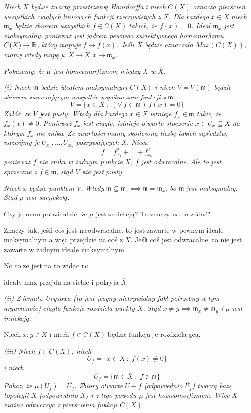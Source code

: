 \documentclass{article}
\begin{document}
\emph{\color{pink}Niech $X$ będzie zwartą przestrzenią Hausdorffa i niech $C(X)$ oznacza pierścień wszystkich ciągłych liniowych funkcji rzeczywistych z $X$. Dla każdego $x\in X$ niech $\mathfrak{m}_x$ będzie zbiorem wszystkich $f\in C(X)$ takich, że $f(x)=0$. Ideał $\mathfrak{m}_x$ jest maksymalny, ponieważ jest jądrem pewnego suriektywnego homomorfizmu $C(X)\to\mathbb{R}$, który mapuje $f\to f(x)$. Jeśli $\overline X$ będzie oznaczało $Max(C(X))$, mamy wtedy mapę $\mu :X\to\overline X$ $x\mapsto \mathfrak{m}_x$.}

\emph{\color{pink}Pokażemy, że $\mu$ jest homeomorfizmem między $X$ w $\overline X$.}

{\color{yellow}\emph{(i) Niech $\mathfrak{m}$ będzie ideałem maksymalnym $C(X)$ i niech $V =V(\mathfrak{m})$ będzie zbiorem zawierającym wszystkie wspólne zera funkcji z $\mathfrak{m}$}
$$V=\{x\in X\;:\;(\forall\;f\in\mathfrak{m})\;f(x)=0\}$$
\emph{Załóż, że $V$ jest pusty. Wtedy dla każdego $x\in X$ istnieje $f_x\in\mathfrak{m}$ takie, że $f_x(x)\neq 0$. Ponieważ $f_x$ jest ciągłe, istnieje otwarte otoczenie $x\in U_x\subseteq X$ na którym $f_x$ nie znika. Ze zwartości mamy skończoną liczbę takich sąsiedztw, nazwijmy je $U_{x_1},...,U_{x_n}$ pokrywających $X$. Niech}
$$f=f_{x_1}^2+...+f_{x_n}^2$$
\emph{ponieważ $f$ nie znika w żadnym punkcie $X$, $f$ jest odwracalne. Ale to jest sprzeczne z $f\in\mathfrak{m}$, stąd $V$ nie jest pusty.}

\emph{Niech $x$ będzie punktem $V$. Wtedy $\mathfrak{m}\subseteq\mathfrak{m}_x\implies \mathfrak{m}=\mathfrak{m}_x$, bo $\mathfrak{m}$ jest maksymalny. Stąd $\mu$ jest surjiekcją.}}

Czy ja mam potwierdzić, że $\mu$ jest suriekcją? To znaczy no to widać?

Znaczy tak, jeśli coś jest nieodwracalne, to jest zawarte w pewnym ideale maksymalnym a więc przejdzie na coś z $\overline X$. Jeśli coś jest odwracalne, to nie jest zawarte w żadnym ideale maksymalnym

No to ze jest na to widac no

ideały max przejda na siebie i pokryja $\overline X$

\emph{\color{yellow}(ii) Z lematu Urysowa (to jest jedyny nietrywialny fakt potrzebny w tym argumencie) ciągła funkcja rozdziela punkty $X$. Stąd $x\neq y\implies\mathfrak{m}_x\neq\mathfrak{m}_y$ i $\mu$ jest injiekcją.}

Niech $x, y\in X$ i niech $f\in C(X)$ będzie funkcją je rozdzielającą.

\emph{\color{yellow}(iii) Niech $f\in C(X)$, niech}
$$U_f=\{x\in X\;:\;f(x)\neq 0\}$$
\emph{\color{yellow}i niech}
$$\overline{U_f}=\{\mathfrak{m}\in\overline X\;:\;f\notin \mathfrak{m}\}$$
\emph{\color{yellow}Pokaż, że $\mu(U_f)=\overline{U_f}$. Zbiory otwarte $U+f$ (odpowiednio $\overline{U_f}$) tworzą bazę topologii $X$ (odpowiednio $\overline X$) i z tego powodu $\mu$ jest homeomorfizmem. Więc $X$ można odtworzyć z pierścienia funkcji $C(X)$}
\end{document}
